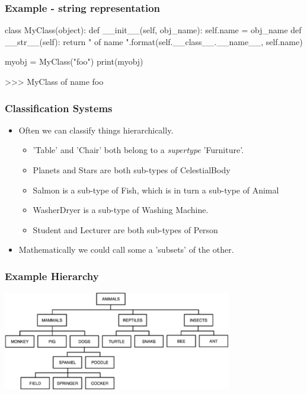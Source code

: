 \documentclass{beamer}
\begin{document}
\begin{frame}[fragile]
\frametitle{Example - string representation}
\begin{code}
class MyClass(object):
  def __init__(self, obj_name):
    self.name = obj_name
  def __str__(self):
    return "{} of name {}".format(self.__class__.__name__, 
                              self.name)
                              
myobj = MyClass("foo")
print(myobj)

>>> MyClass of name foo

\end{code}
\end{frame}


\begin{frame}[fragile]
\frametitle{Classification Systems}
\begin{itemize}
\item Often we can classify things hierarchically.
\begin{itemize}
\item 'Table' and 'Chair' both belong to a \emph{supertype} 'Furniture'.
\item Planets and Stars are both sub-types of CelestialBody
\item Salmon is a sub-type of Fish, which is in turn a sub-type of Animal
\item WasherDryer is a sub-type of Washing Machine.
\item Student and Lecturer are both sub-types of Person
\end{itemize}
\item Mathematically we could call some a 'subsets' of the other.
\end{itemize}

\end{frame}

\begin{frame}[fragile]
\frametitle{Example Hierarchy}
\includegraphics[width=10cm]{animal_hierarch.pdf}
\end{frame}
\end{document}
